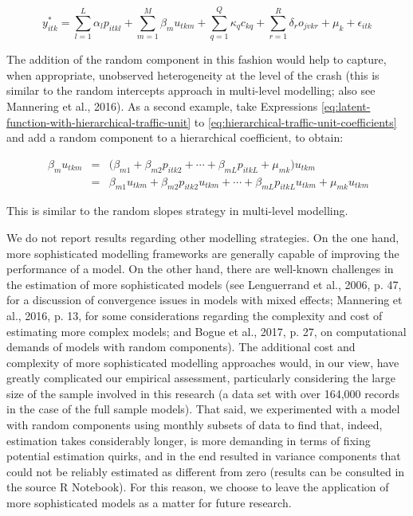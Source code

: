 \documentclass[]{elsarticle} %
\begin{document}
\begin{equation}
\label{eq:latent-function-with-opponent-variables-and-random-component}
y_{itk}^*=\sum_{l=1}^L\alpha_lp_{itkl} + \sum_{m=1}^M\beta_mu_{tkm} + \sum_{q=1}^Q\kappa_qc_{kq} + \sum_{r=1}^R\delta_ro_{jvkr} + \mu_{k} + \epsilon_{itk}
\end{equation}

The addition of the random component in this fashion would help to
capture, when appropriate, unobserved heterogeneity at the level of the
crash (this is similar to the random intercepts approach in multi-level
modelling; also see Mannering et al., 2016). As a second example, take
Expressions \ref{eq:latent-function-with-hierarchical-traffic-unit} to
\ref{eq:hierarchical-traffic-unit-coefficients} and add a random
component to a hierarchical coefficient, to obtain:

\begin{equation}
\label{eq:hierarchical-traffic-unit-coefficients-with-random-component}
\begin{array}{rcl}\
\beta_{m}u_{tkm} &=& \big( \beta_{m1} + \beta_{m2}p_{itk2} + \cdots + \beta_{mL}p_{itkL} + \mu_{mk}\big)u_{tkm}\\ 
&=& \beta_{m1}u_{tkm} + \beta_{m2}p_{itk2}u_{tkm} + \cdots + \beta_{mL}p_{itkL}u_{tkm} + \mu_{mk}u_{tkm}
\end{array}
\end{equation}

This is similar to the random slopes strategy in multi-level modelling.

We do not report results regarding other modelling strategies. On the
one hand, more sophisticated modelling frameworks are generally capable
of improving the performance of a model. On the other hand, there are
well-known challenges in the estimation of more sophisticated models
(see Lenguerrand et al., 2006, p. 47, for a discussion of convergence
issues in models with mixed effects; Mannering et al., 2016, p. 13, for
some considerations regarding the complexity and cost of estimating more
complex models; and Bogue et al., 2017, p. 27, on computational demands
of models with random components). The additional cost and complexity of
more sophisticated modelling approaches would, in our view, have greatly
complicated our empirical assessment, particularly considering the large
size of the sample involved in this research (a data set with over
164,000 records in the case of the full sample models). That said, we
experimented with a model with random components using monthly subsets
of data to find that, indeed, estimation takes considerably longer, is
more demanding in terms of fixing potential estimation quirks, and in
the end resulted in variance components that could not be reliably
estimated as different from zero (results can be consulted in the source
R Notebook). For this reason, we choose to leave the application of more
sophisticated models as a matter for future research.
\end{document}
